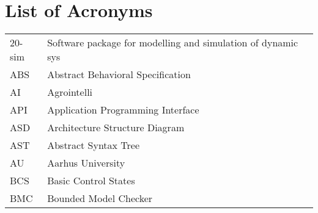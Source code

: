 \section{List of Acronyms}\label{appendix:acronyms}
\begin{longtable}{ll}
20-sim	& Software package for modelling and simulation of dynamic sys\allowbreak\@tems\\
ABS & Abstract Behavioral Specification\\
AI & Agrointelli \\
API & Application Programming Interface \\
ASD & Architecture Structure Diagram \\
AST     & Abstract Syntax Tree\\
AU      & Aarhus University\\
BCS & Basic Control States \\
BMC     &Bounded Model Checker\\

\end{longtable}
